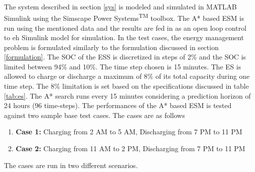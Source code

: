 The system described in section \ref{sys} is modeled and simulated in MATLAB\textsuperscript{\textregistered} Simulink\textsuperscript{\textregistered} using the Simscape Power Systems\textsuperscript{TM} toolbox. The A* based ESM is run using the mentioned data and the results are fed in as an open loop control to eh Simulink model for simulation. In the test cases, the energy management problem is formulated similarly to the formulation discussed in section \ref{formulation}. The  SOC of the ESS is discretized in steps of 2\% and the SOC is limited between  94\%  and  10\%. The time step chosen is 15 minutes. The ES is allowed to charge or discharge a maximum of 8\% of its total capacity during one time step. The 8\% limitation is set based on the specifications discussed in table \ref{tab:es}. The A* search runs every 15 minutes considering a prediction horizon of 24 hours (96 time-steps). The performances of the A* based ESM is tested against two sample base test cases. The cases are as follows 
\begin{enumerate}
\item \textbf{Case 1:} Charging from 2 AM to 5 AM, Discharging from 7 PM to 11 PM

\item \textbf{Case 2:} Charging from 11 AM to 2 PM, Discharging from 7 PM to 11 PM
\end{enumerate}
The cases are run in two different scenarios.

